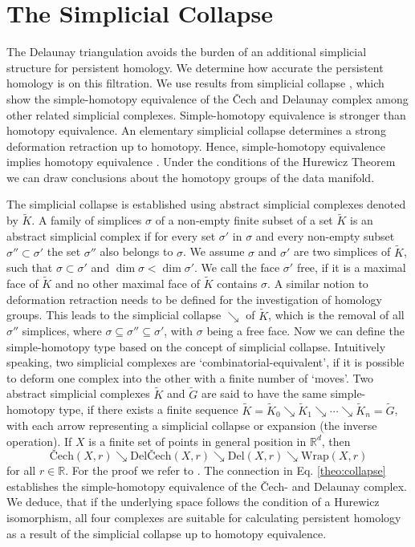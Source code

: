 \documentclass[runningheads]{llncs}
\begin{document}
\section{The Simplicial Collapse}
\label{simcoll}
The Delaunay triangulation avoids the burden of an additional simplicial structure for persistent homology. We determine how accurate the persistent homology is on this filtration. We use results from simplicial collapse \cite{bauer2017morse}, which show the simple-homotopy equivalence of the \v{C}ech and Delaunay complex among other related simplicial complexes. Simple-homotopy equivalence is stronger than homotopy equivalence. An elementary simplicial collapse determines a strong deformation retraction up to homotopy. Hence, simple-homotopy equivalence implies homotopy equivalence \cite[§2]{cohen2012course}. Under the conditions of the Hurewicz Theorem we can draw conclusions about the homotopy groups of the data manifold.

The simplicial collapse is established using abstract simplicial complexes denoted by $\tilde{K}$. A family of simplices $\sigma$ of a non-empty finite subset of a set $\tilde{K}$ is an abstract simplicial complex if for every set $\sigma'$ in $\sigma$ and every non-empty subset $\sigma'' \subset \sigma'$ the set $\sigma''$ also belongs to $\sigma$. We assume $\sigma$ and $\sigma'$ are two simplices of $\tilde{K}$, such that $\sigma \subset \sigma'$ and $\dim \sigma < \dim \sigma'$. We call the face $\sigma'$ free, if it is a maximal face of $\tilde{K}$ and no other maximal face of $\tilde{K}$ contains $\sigma$. A similar notion to deformation retraction needs to be defined for the investigation of homology groups. This leads to the simplicial collapse $\searrow$ of $\tilde{K}$, which is the removal of all $\sigma''$ simplices, where $\sigma \subseteq \sigma'' \subseteq \sigma'$, with $\sigma$ being a free face. Now we can define the simple-homotopy type based on the concept of simplicial collapse. Intuitively speaking, two simplicial complexes are `combinatorial-equivalent', if it is possible to deform one complex into the other with a finite number of `moves'.  Two abstract simplicial complexes $\tilde{K}$ and $\tilde{G}$ are said to have the same simple-homotopy type, if there exists a finite sequence $\tilde{K}=\tilde{K}_0 \searrow \tilde{K}_1 \searrow \cdots \searrow \tilde{K}_n = \tilde{G}$, with each arrow representing a simplicial collapse or expansion (the inverse operation). If $X$ is a finite set of points in general position in $\mathbb{R}^d$, then
\begin{equation}
\label{theo:collapse}
\text{\v{C}ech}(X,r) \searrow \text{Del\v{C}ech}(X,r) \searrow \text{Del}(X,r) \searrow \text{Wrap}(X,r)
\end{equation}
for all $r \in \mathbb{R}$. For the proof we refer to \cite{bauer2017morse}. The connection in Eq. \ref{theo:collapse} establishes the simple-homotopy equivalence of the \v{C}ech- and Delaunay complex. We deduce, that if the underlying space follows the condition of a Hurewicz isomorphism, all four complexes are suitable for calculating persistent homology as a result of the simplicial collapse up to homotopy equivalence.
\end{document}
